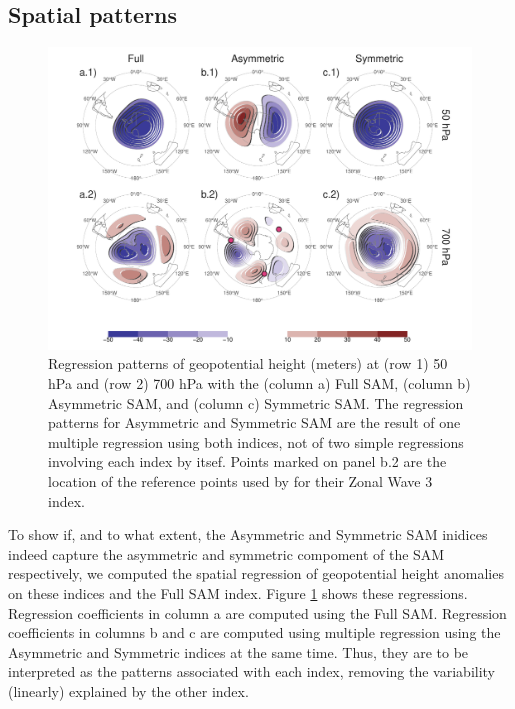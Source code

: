 \documentclass[]{ametsocV5}
\begin{document}
\subsection{Spatial patterns}

\label{sec:spatial}

\begin{figure}
\includegraphics{2d-regr-1} \caption[Regression patterns of geopotential height (meters) at (row 1) 50 hPa and (row 2) 700 hPa with the (column a) Full SAM, (column b) Asymmetric SAM, and (column c) Symmetric SAM]{Regression patterns of geopotential height (meters) at (row 1) 50 hPa and (row 2) 700 hPa with the (column a) Full SAM, (column b) Asymmetric SAM, and (column c) Symmetric SAM. The regression patterns for Asymmetric and Symmetric SAM are the result of one multiple regression using both indices, not of two simple regressions involving each index by itsef. Points marked on panel b.2 are the location of the reference points used by \cite{raphael2004} for their Zonal Wave 3 index. }\label{fig:2d-regr}
\end{figure}

To show if, and to what extent, the Asymmetric and Symmetric SAM
inidices indeed capture the asymmetric and symmetric compoment of the
SAM respectively, we computed the spatial regression of geopotential
height anomalies on these indices and the Full SAM index. Figure
\ref{fig:2d-regr} shows these regressions. Regression coefficients in
column a are computed using the Full SAM. Regression coefficients in
columns b and c are computed using multiple regression using the
Asymmetric and Symmetric indices at the same time. Thus, they are to be
interpreted as the patterns associated with each index, removing the
variability (linearly) explained by the other index.
\end{document}
